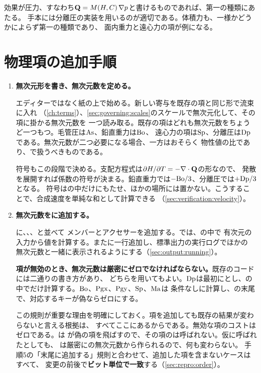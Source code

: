 効果が圧力、すなわち$\mathbf{Q} = M(H,C)\,\nabla p$と書けるものであれば、第一の種類にあたる。
手本には分離圧の実装を用いるのが適切である。体積力も、一様かどうかによらず第一の種類であり、
面内重力と遠心力の項が例になる。

\section{物理項の追加手順}
\label{sec:extending:term}

\begin{enumerate}

\item \textbf{無次元形を書き、無次元数を定める。}

エディターではなく紙の上で始める。新しい寄与を既存の項と同じ形で流束に入れ
（\cref{ch:terms}）、\cref{sec:governing:scales}のスケールで無次元化して、その項に掛かる無次元数を
一つ読み取る。既存の項はどれも無次元数をちょうど一つもつ。毛管圧は$\mathrm{As}$、鉛直重力は$\mathrm{Bo}$、
遠心力の項は$\mathrm{Sp}$、分離圧は$\mathrm{Dp}$である。無次元数が二つ必要になる場合、一方はおそらく
物性値の比であり、で扱うべきものである。

符号もこの段階で決める。支配方程式は$\partial H/\partial T = -\nabla\cdot\mathbf{Q}$の形なので、
発散を展開すれば係数の符号が決まる。鉛直重力では$-\mathrm{Bo}/3$、分離圧では$+\mathrm{Dp}/3$となる。
符号はの中だけにもたせ、ほかの場所には置かない。こうすることで、合成速度を単純な和として計算できる
（\cref{sec:verification:velocity}）。

\item \textbf{無次元数をに追加する。}

に、、、と並べて
メンバーとアクセサーを追加する。では、の中で
有次元の入力から値を計算する。またに一行追加し、標準出力の実行ログでほかの
無次元数と一緒に表示されるようにする（\cref{sec:output:running}）。

\textbf{項が無効のとき、無次元数は厳密にゼロでなければならない。}既存のコードには二通りの書き方があり、
どちらを用いてもよい。$\mathrm{Dp}$は最初にとし、の中でだけ計算する。$\mathrm{Bo}$、$\mathrm{Pgx}$、$\mathrm{Pgy}$、$\mathrm{Sp}$、$\mathrm{Ma}$は
条件なしに計算し、の末尾で、対応するキーが偽ならゼロにする。

この規則が重要な理由を明確にしておく。項を追加しても既存の結果が変わらないと言える根拠は、
すべてここにあるからである。無効な項のコストはゼロである。は
が偽の項を飛ばすので、その項のは呼ばれない。仮に呼ばれたとしても、
は厳密にの無次元数から作られるので、何も変わらない。
手順5の「末尾に追加する」規則と合わせて、追加した項を含まないケースはすべて、
変更の前後で\textbf{ビット単位で一致}する（\cref{sec:repro:order}）。


\end{enumerate}
